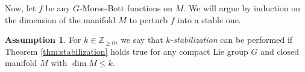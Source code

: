 \documentclass[11pt]{amsart}
\newtheorem{lemma}[theorem]{Lemma}
\theoremstyle{definition}
\newtheorem{assumption}[theorem]{Assumption}
\numberwithin{equation}{subsection}
\begin{document}
Now, let $f$ be any $G$-Morse-Bott functions on $M$. We will argue by induction on the dimension of the manifold $M$ to perturb $f$ into a stable one. 
\begin{assumption}
    For $k\in \mathbb{Z}_{\geq 0}$, we say that \emph{$k$-stabilization} can be performed if Theorem \ref{thm:stabilization} holds true for any compact Lie group $G$ and closed manifold $M$ with $\dim M\leq k$.
\end{assumption}

        
\end{document}
